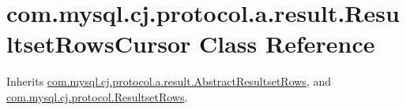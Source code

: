 \hypertarget{classcom_1_1mysql_1_1cj_1_1protocol_1_1a_1_1result_1_1_resultset_rows_cursor}{}\section{com.\+mysql.\+cj.\+protocol.\+a.\+result.\+Resultset\+Rows\+Cursor Class Reference}
\label{classcom_1_1mysql_1_1cj_1_1protocol_1_1a_1_1result_1_1_resultset_rows_cursor}


Inherits \mbox{\hyperlink{classcom_1_1mysql_1_1cj_1_1protocol_1_1a_1_1result_1_1_abstract_resultset_rows}{com.\+mysql.\+cj.\+protocol.\+a.\+result.\+Abstract\+Resultset\+Rows}}, and \mbox{\hyperlink{interfacecom_1_1mysql_1_1cj_1_1protocol_1_1_resultset_rows}{com.\+mysql.\+cj.\+protocol.\+Resultset\+Rows}}.

